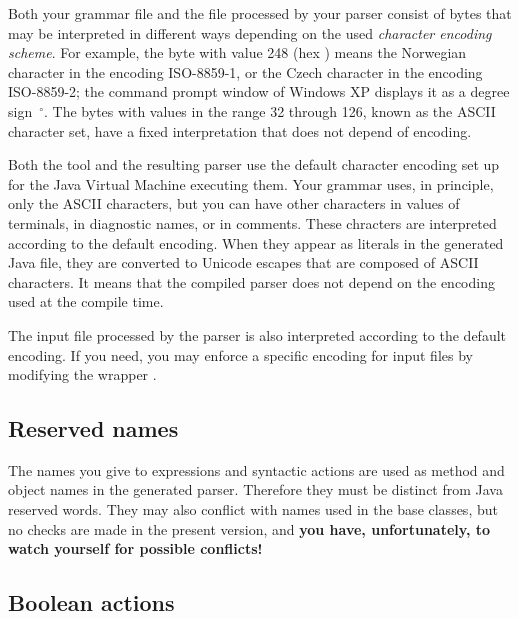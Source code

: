 Both your grammar file and the file processed by your parser 
consist of bytes
that may be interpreted in different ways
depending on the used \emph{character encoding scheme}.
For example, the byte with value 248 (hex ) means the Norwegian character \tx{\o} 
in the encoding ISO-8859-1, or the Czech character 
in the encoding ISO-8859-2;
the command prompt window of Windows XP displays it as a degree sign~$ ^\circ$.
The bytes with values in the range 32 through 126, known as the ASCII character set,
have a fixed interpretation that does not depend of encoding.

Both the  tool and the resulting parser use the default 
character encoding set up for the Java Virtual Machine executing them.
%
Your grammar uses, in principle, only the ASCII characters, 
but you can have other characters in values of terminals, 
in diagnostic names, or in comments.
These chracters are interpreted according to the default encoding.
When they appear as literals in the generated Java file,
they are converted to Unicode escapes that are composed of ASCII characters.
It means that the compiled parser does not depend on the 
encoding used at the compile time.

The input file processed by the parser is also interpreted 
according to the default encoding.
If you need, you may enforce a specific encoding for input files
by modifying the wrapper .

\subsection{Reserved names}

The names you give to expressions and syntactic actions are used as  
method and object names in the generated parser.
Therefore they must be distinct from Java reserved words.
They may also conflict with names used in the base classes,
but no checks are made in the present version, and
\textbf{you have, unfortunately, to watch yourself for possible conflicts!} 

\subsection{Boolean actions\label{BoolAct}}

